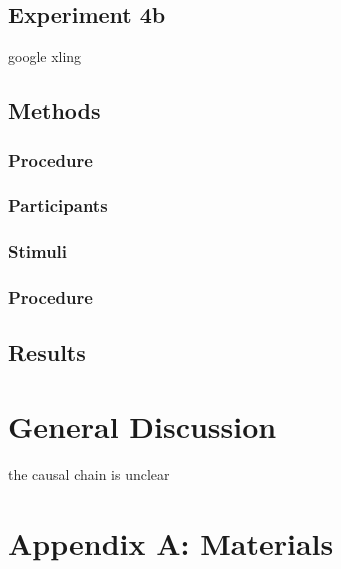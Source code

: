 \documentclass[man]{apa2}
\begin{document}
\subsection{\textbf{Experiment 4b}}
google xling
\subsection{Methods}
\subsubsection{Procedure}
\subsubsection{Participants}
\subsubsection{Stimuli}
\subsubsection{Procedure}
\subsection{Results}

\section{General Discussion}
the causal chain is unclear 





\newpage
\theappendix 

\section{Appendix A: Materials}
\end{document}
